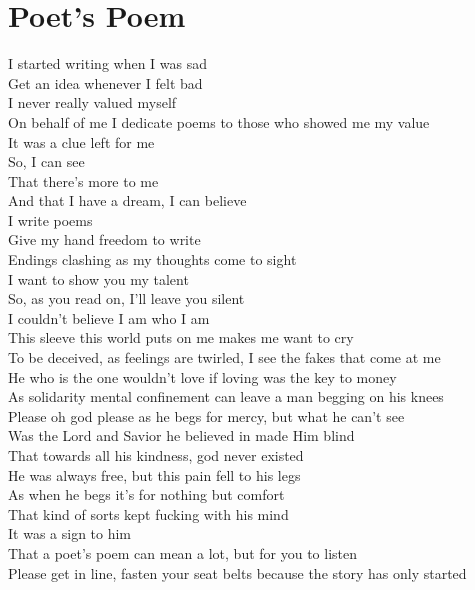 \documentclass[12pt, b5paper]{article}
\begin{document}
\section{Poet's Poem}
I started writing when I was sad\\
Get an idea whenever I felt bad\\
I never really valued myself\\ 
On behalf of me I dedicate poems to those who showed me my value\\ 
It was a clue left for me\\ 
So, I can see\\
That there’s more to me\\ 
And that I have a dream, I can believe\\ 
I write poems\\ 
Give my hand freedom to write\\ 
Endings clashing as my thoughts come to sight\\ 
I want to show you my talent\\ 
So, as you read on, I’ll leave you silent\\ 
I couldn’t believe I am who I am\\ 
This sleeve this world puts on me makes me want to cry\\
To be deceived, as feelings are twirled, I see the fakes that come at me\\ 
He who is the one wouldn’t love if loving was the key to money\\
As solidarity mental confinement can leave a man begging on his knees\\ 
Please oh god please as he begs for mercy, but what he can’t see\\ 
Was the Lord and Savior he believed in made Him blind\\ 
That towards all his kindness, god never existed\\ 
He was always free, but this pain fell to his legs\\ 
As when he begs it’s for nothing but comfort\\
That kind of sorts kept fucking with his mind\\ 
It was a sign to him\\
That a poet’s poem can mean a lot, but for you to listen\\
Please get in line, fasten your seat belts because the story has only started

\newpage 
\end{document}
